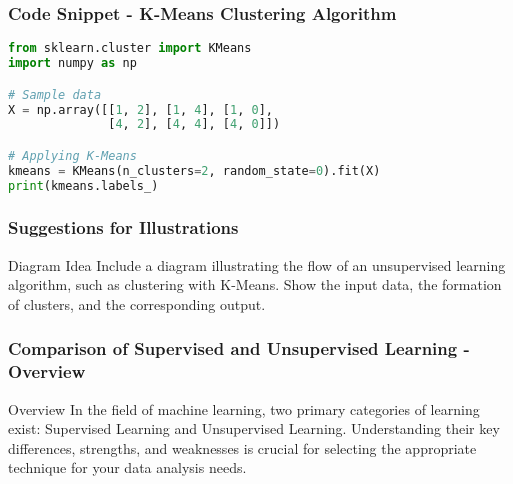 \documentclass[aspectratio=169]{beamer}
\begin{document}
\begin{frame}[fragile]
    \frametitle{Code Snippet - K-Means Clustering Algorithm}
    \begin{lstlisting}[language=Python]
from sklearn.cluster import KMeans
import numpy as np

# Sample data
X = np.array([[1, 2], [1, 4], [1, 0],
              [4, 2], [4, 4], [4, 0]])

# Applying K-Means
kmeans = KMeans(n_clusters=2, random_state=0).fit(X)
print(kmeans.labels_)
    \end{lstlisting}
\end{frame}

\begin{frame}[fragile]
    \frametitle{Suggestions for Illustrations}
    \begin{block}{Diagram Idea}
        Include a diagram illustrating the flow of an unsupervised learning algorithm, such as clustering with K-Means. 
        Show the input data, the formation of clusters, and the corresponding output.
    \end{block}
\end{frame}

\begin{frame}[fragile]
    \frametitle{Comparison of Supervised and Unsupervised Learning - Overview}
    \begin{block}{Overview}
        In the field of machine learning, two primary categories of learning exist:
        Supervised Learning and Unsupervised Learning. Understanding their key differences,
        strengths, and weaknesses is crucial for selecting the appropriate technique for your
        data analysis needs.
    \end{block}
\end{frame}
\end{document}
